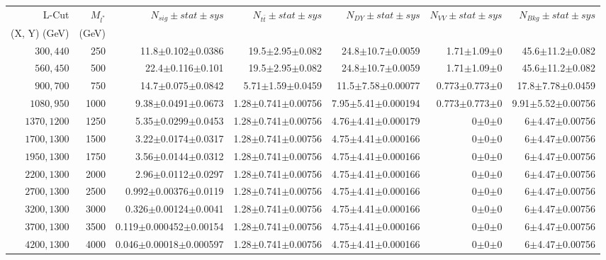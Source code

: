 \documentclass[]{article}
\begin{document}
\begin{table}
\begin{center}
\scriptsize{
\begin{tabular}{ |r|r|r|r|r|r|r|}
\hline 
L-Cut & $M_{l^*}$ & $N_{sig}\pm stat \pm sys $ &$N_{t\bar{t}}\pm stat \pm sys $ & $N_{DY}\pm stat \pm sys $ & $N_{VV}\pm stat \pm sys $ &$N_{Bkg}\pm stat \pm sys$\\
 (X, Y) (GeV) & (GeV) & && &&\\
\hline 
$300, 440$ & 250 & 11.8$\pm$0.102$\pm$0.0386 & 19.5$\pm$2.95$\pm$0.082 & 24.8$\pm$10.7$\pm$0.0059 & 1.71$\pm$1.09$\pm$0 & 45.6$\pm$11.2$\pm$0.082 \\
$560, 450$ & 500 & 22.4$\pm$0.116$\pm$0.101 & 19.5$\pm$2.95$\pm$0.082 & 24.8$\pm$10.7$\pm$0.0059 & 1.71$\pm$1.09$\pm$0 & 45.6$\pm$11.2$\pm$0.082 \\
$900, 700$ & 750 & 14.7$\pm$0.075$\pm$0.0842 & 5.71$\pm$1.59$\pm$0.0459 & 11.5$\pm$7.58$\pm$0.00077 & 0.773$\pm$0.773$\pm$0 & 17.8$\pm$7.78$\pm$0.0459 \\
$1080,950$ & 1000 & 9.38$\pm$0.0491$\pm$0.0673 & 1.28$\pm$0.741$\pm$0.00756 & 7.95$\pm$5.41$\pm$0.000194 & 0.773$\pm$0.773$\pm$0 & 9.91$\pm$5.52$\pm$0.00756 \\
$1370,1200$ & 1250 & 5.35$\pm$0.0299$\pm$0.0453 & 1.28$\pm$0.741$\pm$0.00756 & 4.76$\pm$4.41$\pm$0.000179 & 0$\pm$0$\pm$0 & 6$\pm$4.47$\pm$0.00756 \\
$1700,1300$ & 1500 & 3.22$\pm$0.0174$\pm$0.0317 & 1.28$\pm$0.741$\pm$0.00756 & 4.75$\pm$4.41$\pm$0.000166 & 0$\pm$0$\pm$0 & 6$\pm$4.47$\pm$0.00756 \\
$1950,1300$ & 1750 & 3.56$\pm$0.0144$\pm$0.0312 & 1.28$\pm$0.741$\pm$0.00756 & 4.75$\pm$4.41$\pm$0.000166 & 0$\pm$0$\pm$0 & 6$\pm$4.47$\pm$0.00756 \\
$2200,1300$ & 2000 & 2.96$\pm$0.0112$\pm$0.0297 & 1.28$\pm$0.741$\pm$0.00756 & 4.75$\pm$4.41$\pm$0.000166 & 0$\pm$0$\pm$0 & 6$\pm$4.47$\pm$0.00756 \\
$2700,1300$ & 2500 & 0.992$\pm$0.00376$\pm$0.0119 & 1.28$\pm$0.741$\pm$0.00756 & 4.75$\pm$4.41$\pm$0.000166 & 0$\pm$0$\pm$0 & 6$\pm$4.47$\pm$0.00756 \\
$3200,1300$ & 3000 & 0.326$\pm$0.00124$\pm$0.0041 & 1.28$\pm$0.741$\pm$0.00756 & 4.75$\pm$4.41$\pm$0.000166 & 0$\pm$0$\pm$0 & 6$\pm$4.47$\pm$0.00756 \\
$3700,1300$ & 3500 & 0.119$\pm$0.000452$\pm$0.00154 & 1.28$\pm$0.741$\pm$0.00756 & 4.75$\pm$4.41$\pm$0.000166 & 0$\pm$0$\pm$0 & 6$\pm$4.47$\pm$0.00756 \\
$4200,1300$ & 4000 & 0.046$\pm$0.00018$\pm$0.000597 & 1.28$\pm$0.741$\pm$0.00756 & 4.75$\pm$4.41$\pm$0.000166 & 0$\pm$0$\pm$0 & 6$\pm$4.47$\pm$0.00756 \\

\end{tabular}}
\end{center}
\end{table}
\end{document}
